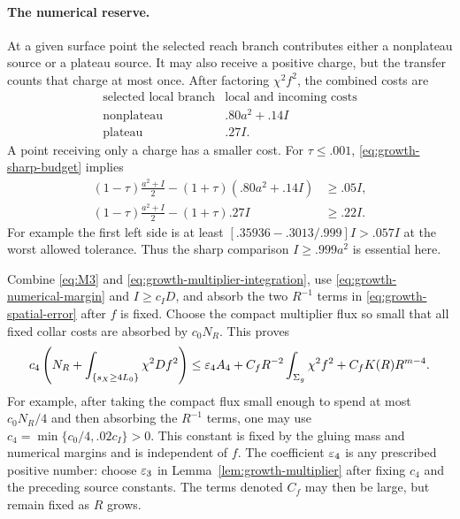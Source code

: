 \paragraph{The numerical reserve.}
At a given surface point the selected reach branch contributes either
a nonplateau source or a plateau source.  It may also receive a positive
charge, but the transfer counts that charge at most once.  After
factoring $\chi^2f^2$, the combined costs are
\[
 \begin{array}{c|c}
 \text{selected local branch}&\text{local and incoming costs}\\ \hline
 \text{nonplateau}& .80a^2+.14I\\
 \text{plateau}& .27I.
 \end{array}
\]
A point receiving only a charge has a smaller cost.  For
$\tau\le .001$, \eqref{eq:growth-sharp-budget} implies
\begin{equation}\label{eq:growth-numerical-margin}
 \begin{aligned}
 (1-\tau)\frac{a^2+I}{2}
       -(1+\tau)(.80a^2+.14I)&\ge .05I,\\
 (1-\tau)\frac{a^2+I}{2}-(1+\tau).27I&\ge .22I.
 \end{aligned}
\end{equation}
For example the first left side is at least
$[.35936-.3013/.999]I>.057I$ at the worst allowed tolerance.
Thus the sharp comparison $I\ge .999a^2$ is essential here.

Combine \eqref{eq:M3} and
\eqref{eq:growth-multiplier-integration}, use
\eqref{eq:growth-numerical-margin} and $I\ge c_ID$, and absorb the
two $R^{-1}$ terms in \eqref{eq:growth-spatial-error} after $f$ is fixed.
Choose the compact multiplier flux so small that all fixed collar
costs are absorbed by $c_0N_R$.  This proves
\begin{equation}\label{eq:M7}
 c_4\left(N_R+
      \int_{\{s_X\ge4L_0\}}\chi^2Df^2\right)
 \le\varepsilon_4 A_4+C_fR^{-2}\int_{\Sigma_g}\chi^2f^2
       +C_fK(R)R^{m-4}.
\end{equation}
For example, after taking the compact flux small enough to spend at
most $c_0N_R/4$ and then absorbing the $R^{-1}$ terms, one may use
$c_4=\min\{c_0/4,.02c_I\}>0$.  This constant is fixed by the gluing
mass and numerical margins and is independent of $f$.
The coefficient $\varepsilon_4$ is any prescribed
positive number: choose $\varepsilon_3$ in Lemma~\ref{lem:growth-multiplier}
after fixing $c_4$ and the preceding source constants.  The terms
denoted $C_f$ may then be large, but remain fixed as $R$ grows.


